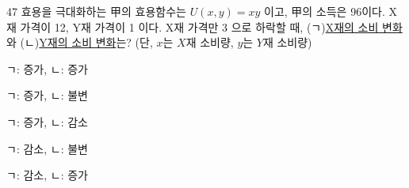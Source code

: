 \begin{question}{47}
효용을 극대화하는 甲의 효용함수는 $U(x,y)=xy$ 이고, 甲의 소득은 96이다. X재 가격이 12, Y재 가격이 1 이다. X재 가격만 3 으로 하락할 때, (ㄱ)\uline{X재의 소비 변화}와 (ㄴ)\uline{Y재의 소비 변화}는? (단, $x$는 $X$재 소비량, $y$는 $Y$재 소비량)
\begin{choices}
  \item ㄱ: 증가, ㄴ: 증가
  \item ㄱ: 증가, ㄴ: 불변
  \item ㄱ: 증가, ㄴ: 감소
  \item ㄱ: 감소, ㄴ: 불변
  \item ㄱ: 감소, ㄴ: 증가
\end{choices}
\end{question}
